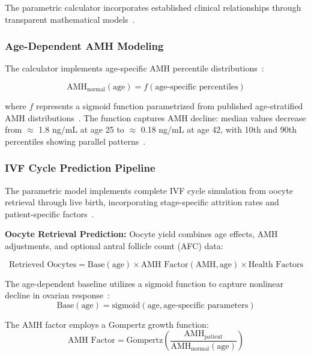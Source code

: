 \documentclass[pdflatex,sn-basic]{sn-jnl}%
\begin{document}
The parametric calculator incorporates established clinical relationships through transparent mathematical models~\cite{rudin2019stop}.

\subsubsection{Age-Dependent AMH Modeling}

The calculator implements age-specific AMH percentile distributions~\cite{lee2017amh,song2021amh}:

\begin{equation}
\text{AMH}_{\text{normal}}(\text{age}) = f(\text{age-specific percentiles})
\end{equation}

where $f$ represents a sigmoid function parametrized from published age-stratified AMH distributions~\cite{lee2017amh}. The function captures AMH decline: median values decrease from $\approx$ 1.8 ng/mL at age 25 to $\approx$ 0.18 ng/mL at age 42, with 10th and 90th percentiles showing parallel patterns~\cite{lee2017amh}.

\subsubsection{IVF Cycle Prediction Pipeline}

The parametric model implements complete IVF cycle simulation from oocyte retrieval through live birth, incorporating stage-specific attrition rates and patient-specific factors~\cite{seifer2002amh,ovarian_reserve_testing}.

\textbf{Oocyte Retrieval Prediction:}
Oocyte yield combines age effects, AMH adjustments, and optional antral follicle count (AFC) data:

\begin{equation}
\text{Retrieved Oocytes} = \text{Base}(\text{age}) \times \text{AMH Factor}(\text{AMH}, \text{age}) \times \text{Health Factors}
\end{equation}

The age-dependent baseline utilizes a sigmoid function to capture nonlinear decline in ovarian response~\cite{acog2017advanced}:
\begin{equation}
\text{Base}(\text{age}) = \text{sigmoid}(\text{age}, \text{age-specific parameters})
\end{equation}

The AMH factor employs a Gompertz growth function:
\begin{equation}
\text{AMH Factor} = \text{Gompertz}\left(\frac{\text{AMH}_{\text{patient}}}{\text{AMH}_{\text{normal}}(\text{age})}\right)
\end{equation}
\end{document}
